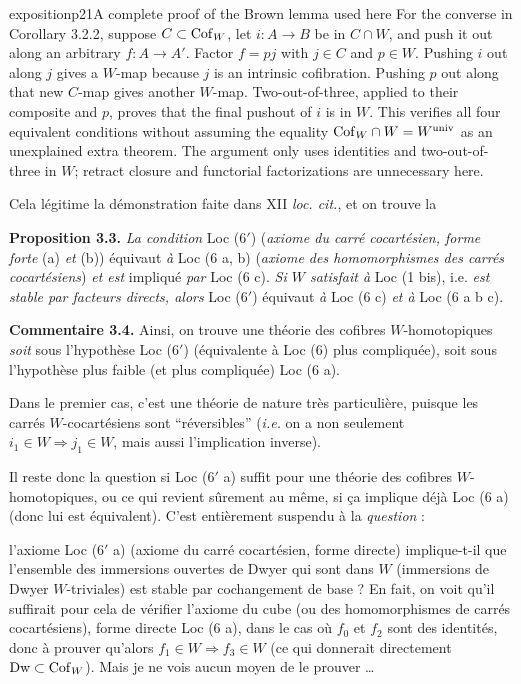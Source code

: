 \begin{dcomment}{exposition}{p21}{A complete proof of the Brown lemma used here}
For the converse in Corollary 3.2.2, suppose $C\subset\mathrm{Cof}_W$, let $i:A\to B$ be in $C\cap W$, and push it out along an arbitrary $f:A\to A'$. Factor $f=pj$ with $j\in C$ and $p\in W$. Pushing $i$ out along $j$ gives a $W$-map because $j$ is an intrinsic cofibration. Pushing $p$ out along that new $C$-map gives another $W$-map. Two-out-of-three, applied to their composite and $p$, proves that the final pushout of $i$ is in $W$. This verifies all four equivalent conditions without assuming the equality $\mathrm{Cof}_W\cap W=W^{\mathrm{univ}}$ as an unexplained extra theorem. The argument only uses identities and two-out-of-three in $W$; retract closure and functorial factorizations are unnecessary here.
\end{dcomment}


Cela légitime la démonstration faite dans XII \textit{loc. cit.}, et on trouve la

\textbf{Proposition 3.3.} \textit{La condition} Loc (6$'$) (\textit{axiome du carré cocartésien, forme forte} (a) \textit{et} (b)) équivaut \textit{à} Loc (6 a, b) (\textit{axiome des homomorphismes des carrés cocartésiens}) \textit{et est} impliqué \textit{par} Loc (6 c). \textit{Si $W$ satisfait à} Loc (1 bis), i.e. \textit{est stable par facteurs directs, alors} Loc (6$'$) équivaut \textit{à} Loc (6 c) \textit{et à} Loc (6 a b c).

\textbf{Commentaire 3.4.} Ainsi, on trouve une théorie des cofibres $W$-homotopiques \textit{soit} sous l'hypothèse Loc (6$'$) (équivalente à Loc (6) plus compliquée), soit sous l'hypothèse plus faible (et plus compliquée) Loc (6 a).

Dans le premier cas, c'est une théorie de nature très particulière, puisque les carrés $W$-cocartésiens sont “réversibles” (\textit{i.e.} on a non seulement $i_1 \in W \Longrightarrow j_1 \in W$, mais aussi l'implication inverse).

Il reste donc la question si Loc (6$'$ a) suffit pour une théorie des cofibres $W$-homotopiques, ou ce qui revient sûrement au même, si ça implique déjà Loc (6 a) (donc lui est équivalent). C'est entièrement suspendu à la \textit{question} :

l'axiome Loc (6$'$ a) (axiome du carré cocartésien, forme directe) implique-t-il que l'ensemble des immersions ouvertes de Dwyer qui sont dans $W$ (immersions de Dwyer $W$-triviales) est stable par cochangement de base ? En fait, on voit qu'il suffirait pour cela de vérifier l'axiome du cube (ou des homomorphismes de carrés cocartésiens), forme directe Loc (6 a), dans le cas où $f_0$ et $f_2$ sont des identités, donc à prouver qu'alors $f_1 \in W \Longrightarrow f_3 \in W$ (ce qui donnerait directement $\mathrm{Dw} \subset \mathrm{Cof}_W$). Mais je ne vois aucun moyen de le prouver \dots

